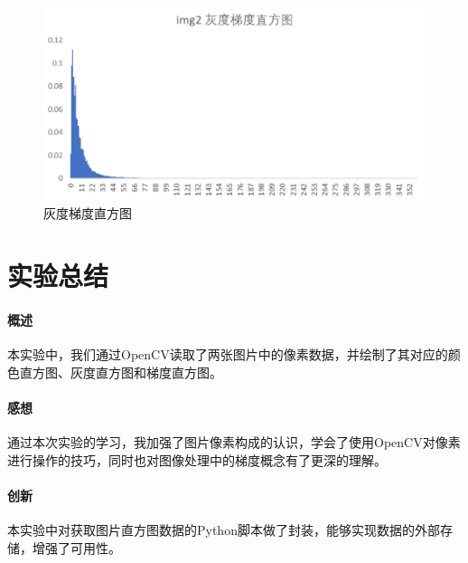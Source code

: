 \documentclass{article}
\begin{document}
\begin{figure}[htb]
\centering
\includegraphics[width=13.5cm]{img/3-2.png}
\caption{灰度梯度直方图}
\label{3.2}
\end{figure}

\section{实验总结}
\paragraph{概述}
本实验中，我们通过OpenCV读取了两张图片中的像素数据，并绘制了其对应的颜色直方图、灰度直方图和梯度直方图。

\paragraph{感想}
通过本次实验的学习，我加强了图片像素构成的认识，学会了使用OpenCV对像素进行操作的技巧，同时也对图像处理中的梯度概念有了更深的理解。

\paragraph{创新}
本实验中对获取图片直方图数据的Python脚本做了封装，能够实现数据的外部存储，增强了可用性。
\end{document}

